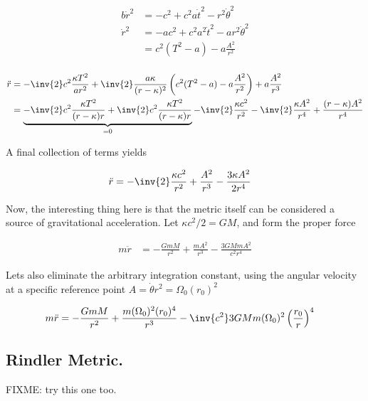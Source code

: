 \documentclass{article}      %
\newcommand{\CC}[0]{c^2}
\newcommand{\dottheta}[0]{\dot{\theta}}
\newcommand{\tdot}[0]{\dot{t}}
\newcommand{\rdot}[0]{\dot{r}}
\newcommand{\rddot}[0]{\ddot{r}}
\begin{document}
\begin{align*}
b \rdot^2 &= -\CC +\CC a \tdot^2 - r^2 \dottheta^2  \\
\rdot^2
&= - a \CC +\CC a^2 \tdot^2 - a r^2 \dottheta^2 \\
&= \CC(T^2 - a) - a \frac{A^2}{r^2} \\
\end{align*}

\begin{align*}
\rddot 
&= -\inv{2} c^2 \frac{\kappa T^2}{a r^2} + \inv{2} \frac{a \kappa}{(r-\kappa)^2} \left( \CC(T^2 - a) - a \frac{A^2}{r^2} \right) + a \frac{A^2}{r^3} \\
&=
\underbrace{
- \inv{2} \CC \frac{\kappa T^2}{(r-\kappa) r} 
+ \inv{2} \CC \frac{\kappa T^2}{(r-\kappa) r} 
}_{=0}
- \inv{2} \frac{\kappa c^2}{r^2} 
- \inv{2} \frac{\kappa A^2}{r^4}
+ \frac{(r-\kappa)A^2}{r^4} \\
\end{align*}

A final collection of terms yields

\begin{align}
\rddot &=
- \inv{2} \frac{\kappa c^2}{r^2} 
+ \frac{A^2}{r^3}
- \frac{3 \kappa A^2}{2 r^4}
\end{align}

Now, the interesting thing here is that the metric itself can be considered a source of gravitational acceleration.  Let $\kappa c^2/2 = G M$, and form the proper
force

\begin{align*}
m \rddot &=
- \frac{G m M }{r^2} 
+ \frac{m A^2}{r^3}
- \frac{3 G M m A^2}{c^2 r^4}
\end{align*}

Lets also eliminate the arbitrary integration constant, using the angular velocity at a specific reference point $A = \dottheta r^2 = \Omega_0 (r_0)^2$

\begin{align}
m \rddot &=
- \frac{G m M }{r^2} 
+ \frac{m (\Omega_0)^2 (r_0)^4}{r^3}
- \inv{c^2} 3 G M m ({\Omega}_0)^2 \left( \frac{r_0}{r} \right)^4
\end{align}

\subsection{ Rindler Metric. }

FIXME: try this one too.


%
\end{document}
